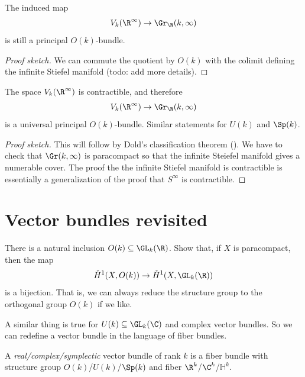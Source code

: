 \documentclass[11pt]{amsart}
\begin{document}
\begin{proposition} The induced map
\begin{align*}
    V_k(\R^\infty) \to \Gr_\R(k,\infty)
\end{align*}
is still a principal $O(k)$-bundle.
\end{proposition}
\begin{proof}[Proof sketch] We can commute the quotient by $O(k)$ with the colimit defining the infinite Stiefel manifold (todo: add more details).
\end{proof}

\begin{theorem}\label{thm:stiefel-manifold-universal}
The space $V_k(\R^\infty)$ is contractible, and therefore 
\begin{align*}
    V_k(\R^\infty) \to \Gr_\R(k,\infty)
\end{align*}
is a universal principal $O(k)$-bundle. Similar statements for $U(k)$ and $\Sp(k)$.
\end{theorem}
\begin{proof}[Proof sketch] This will follow by Dold's classification theorem (). We have to check that $\Gr(k,\infty)$ is paracompact so that the infinite Steiefel manifold gives a numerable cover. The proof the the infinite Stiefel manifold is contractible is essentially a generalization of the proof that $S^\infty$ is contractible.
\end{proof}


\section{Vector bundles revisited}

\begin{exercise} There is a natural inclusion $O(k) \subseteq \GL_k(\R)$. Show that, if $X$ is paracompact, then the map
\begin{align*}
    \check{H}^1(X, O(k)) \to \check{H}^1(X,\GL_k(\R))
\end{align*}
is a bijection. That is, we can always reduce the structure group to the orthogonal group $O(k)$ if we like.
\end{exercise}

A similar thing is true for $U(k) \subseteq \GL_k(\C)$ and complex vector bundles. So we can redefine a vector bundle in the language of fiber bundles.

\begin{definition}\label{def:vector-bundle}
A \emph{real/complex/symplectic} vector bundle of rank $k$ is a fiber bundle with structure group $O(k)$/$U(k)$/$\Sp(k)$ and fiber $\R^k$/$\C^k$/$\mathbb{H}^k$.
\end{definition}
\end{document}
